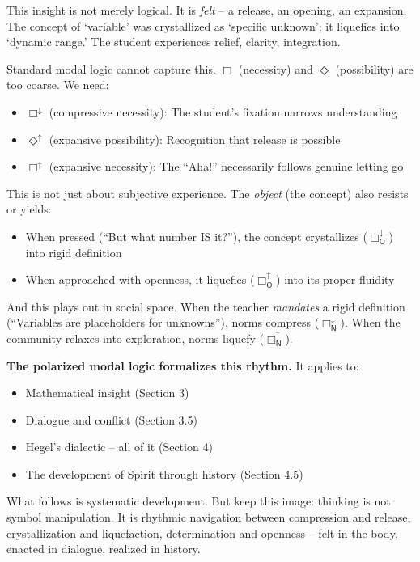 \documentclass[12pt]{book}
\begin{document}
This insight is not merely logical. It is \textit{felt} -- a release, an opening, an expansion. The concept of `variable' was crystallized as `specific unknown'; it liquefies into `dynamic range.' The student experiences relief, clarity, integration.

Standard modal logic cannot capture this. $\Box$ (necessity) and $\Diamond$ (possibility) are too coarse. We need:
\begin{itemize}
\item $\Box^{\downarrow}$ (compressive necessity): The student's fixation narrows understanding
\item $\Diamond^{\uparrow}$ (expansive possibility): Recognition that release is possible
\item $\Box^{\uparrow}$ (expansive necessity): The ``Aha!'' necessarily follows genuine letting go
\end{itemize}

This is not just about subjective experience. The \textit{object} (the concept) also resists or yields:
\begin{itemize}
\item When pressed (``But what number IS it?''), the concept crystallizes ($\Box_{\mathsf{O}}^{\downarrow}$) into rigid definition
\item When approached with openness, it liquefies ($\Box_{\mathsf{O}}^{\uparrow}$) into its proper fluidity
\end{itemize}

And this plays out in social space. When the teacher \textit{mandates} a rigid definition (``Variables are placeholders for unknowns''), norms compress ($\Box_{\mathsf{N}}^{\downarrow}$). When the community relaxes into exploration, norms liquefy ($\Box_{\mathsf{N}}^{\uparrow}$).

\textbf{The polarized modal logic formalizes this rhythm.} It applies to:
\begin{itemize}
\item Mathematical insight (Section 3)
\item Dialogue and conflict (Section 3.5)
\item Hegel's dialectic -- all of it (Section 4)
\item The development of Spirit through history (Section 4.5)
\end{itemize}

What follows is systematic development. But keep this image: thinking is not symbol manipulation. It is rhythmic navigation between compression and release, crystallization and liquefaction, determination and openness -- felt in the body, enacted in dialogue, realized in history.
\end{document}
